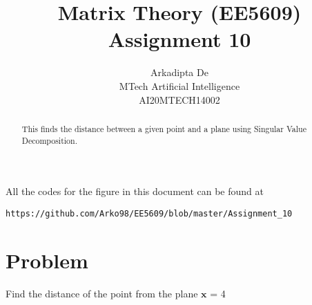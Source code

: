 \documentclass[journal,12pt,twocolumn]{IEEEtran}
\begin{document}
\makeatletter
{}
\makeatother
\let\StandardTheFigure\thefigure
\let\vec\mathbf
\renewcommand{\thefigure}{\theproblem}
\def\putbox#1#2#3{\makebox[0in][l]{\makebox[#1][l]{}\raisebox{\baselineskip}[0in][0in]{\raisebox{#2}[0in][0in]{#3}}}}
     \def\rightbox#1{\makebox[0in][r]{#1}}
     \def\centbox#1{\makebox[0in]{#1}}
     \def\topbox#1{\raisebox{-\baselineskip}[0in][0in]{#1}}
     \def\midbox#1{\raisebox{-0.5\baselineskip}[0in][0in]{#1}}
\vspace{3cm}
\title{Matrix Theory (EE5609) Assignment 10}
\author{Arkadipta De\\MTech Artificial Intelligence\\AI20MTECH14002}

\maketitle
\newpage
\bigskip
\renewcommand{\thefigure}{\theenumi}
\renewcommand{\thetable}{\theenumi}

\begin{abstract}
This finds the distance between a given point and a plane using Singular Value Decomposition.
\end{abstract}

All the codes for the figure in this document can be found at
\begin{lstlisting}
https://github.com/Arko98/EE5609/blob/master/Assignment_10
\end{lstlisting}

\section{\textbf{Problem}}
Find the distance of the point  from the plane $\vec{x}$ = 4
\end{document}
